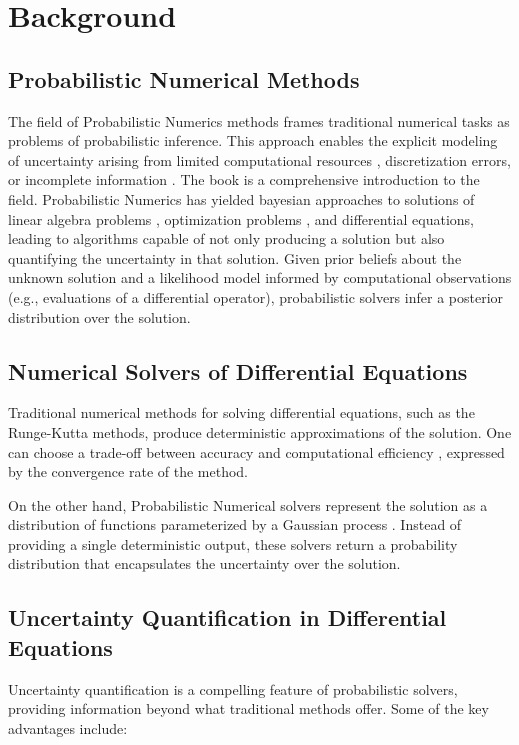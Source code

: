 \section{Background}\label{sec:background}

\subsection*{Probabilistic Numerical Methods}
The field of Probabilistic Numerics methods frames traditional numerical tasks as problems of probabilistic inference. This approach enables the explicit modeling of uncertainty arising from limited computational resources \cite{itergp}, discretization errors\cite{pnmol}, or incomplete information \cite{exponential_probabilistic}. The book \cite{probnum} is a comprehensive introduction to the field. Probabilistic Numerics has yielded bayesian approaches to solutions of linear algebra problems \cite{pn_solver}, optimization problems \cite{pn_optimization}, and differential equations\cite{invention_of_ODE_solver}, leading to algorithms capable of not only producing a solution but also quantifying the uncertainty in that solution. Given prior beliefs about the unknown solution and a likelihood model informed by computational observations (e.g., evaluations of a differential operator), probabilistic solvers infer a posterior distribution over the solution.


\subsection*{Numerical Solvers of Differential Equations}
Traditional numerical methods for solving differential equations, such as the Runge-Kutta \cite{runge} methods, produce deterministic approximations of the solution. One can choose a trade-off between accuracy and computational efficiency \cite{butcher}, expressed by the convergence rate \cite{kanschat} of the method.

On the other hand, Probabilistic Numerical solvers represent the solution as a distribution of functions\cite{nicoThesis} parameterized by a Gaussian process \cite{gp_Rasmussen}. Instead of providing a single deterministic output, these solvers return a probability distribution that encapsulates the uncertainty over the solution. 

\subsection*{Uncertainty Quantification in Differential Equations}
Uncertainty quantification is a compelling feature of probabilistic solvers, providing information beyond what traditional methods offer. Some of the key advantages include:

